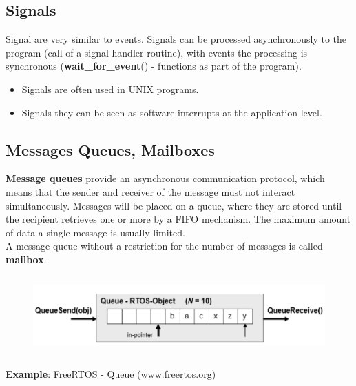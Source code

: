 
\subsection{Signals}

Signal are very similar to events. Signals can be processed asynchronously to the program (call of a signal-handler routine), with events the processing is synchronous (\textbf{wait\_for\_event}() - functions as part of the program).

\begin{itemize}
\item Signals are often used in UNIX programs. 
\item Signals they can be seen as software interrupts at the application level.
\end{itemize}

\subsection{Messages Queues, Mailboxes}

\textbf{Message queues} provide an asynchronous communication protocol, which means that the sender and receiver of the message must not interact simultaneously. Messages will be placed on a queue, where they are stored until the recipient retrieves one or more by a FIFO mechanism. The maximum amount of data a single message is usually limited.\\

A message queue without a restriction for the number of messages is called \textbf{mailbox}.

 	\begin{figure}[h]
    \centering
    \includegraphics[width=14cm, height=3cm]{Images/image115.png}
    \label{fig:Fig 62}
    \end{figure}
\nsl{\newpage}    
\textbf{Example}: FreeRTOS - Queue (www.freertos.org)
\os{\newpage}


